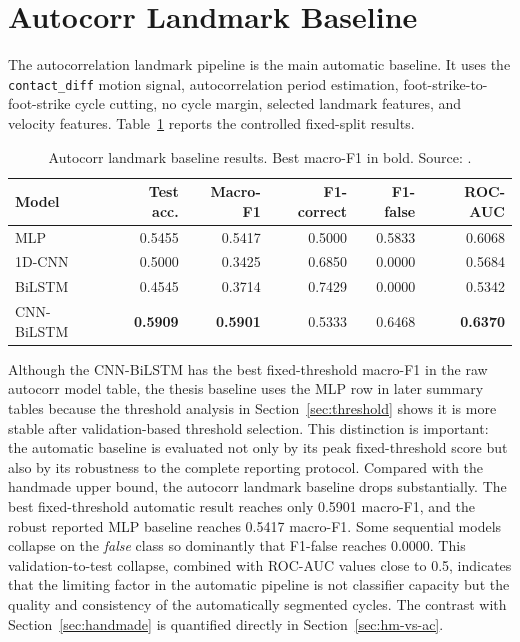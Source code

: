 \section{Autocorr Landmark Baseline}
\label{sec:autocorr-baseline}

The autocorrelation landmark pipeline is the main automatic baseline. It uses
the \texttt{contact\_diff} motion signal, autocorrelation period estimation,
foot-strike-to-foot-strike cycle cutting, no cycle margin, selected landmark
features, and velocity features. Table~\ref{tab:autocorr} reports the
controlled fixed-split results.

\begin{table}[htbp]
\centering
\caption[Autocorr landmark baseline results. Best macro-F1 in bold. Source: \protect{}.]{Autocorr landmark baseline results. Best macro-F1 in bold. Source: .}
\label{tab:autocorr}
\small
\begin{tabular}{lrrrrr}
\toprule
Model & Test acc. & Macro-F1 & F1-correct & F1-false & ROC-AUC \\
\midrule
MLP & 0.5455 & 0.5417 & 0.5000 & 0.5833 & 0.6068 \\
1D-CNN & 0.5000 & 0.3425 & 0.6850 & 0.0000 & 0.5684 \\
BiLSTM & 0.4545 & 0.3714 & 0.7429 & 0.0000 & 0.5342 \\
CNN-BiLSTM & \textbf{0.5909} & \textbf{0.5901} & 0.5333 & 0.6468 & \textbf{0.6370} \\
\bottomrule
\end{tabular}
\end{table}

Although the CNN-BiLSTM has the best fixed-threshold macro-F1 in the raw
autocorr model table, the thesis baseline uses the MLP row in later summary
tables because the threshold analysis in Section~\ref{sec:threshold} shows it
is more stable after validation-based threshold selection. This distinction is
important: the automatic baseline is evaluated not only by its peak
fixed-threshold score but also by its robustness to the complete reporting
protocol. Compared with the handmade upper bound, the autocorr landmark baseline drops
substantially. The best fixed-threshold automatic result reaches only 0.5901
macro-F1, and the robust reported MLP baseline reaches 0.5417 macro-F1. Some
sequential models collapse on the \emph{false} class so dominantly that F1-false reaches 0.0000.
This validation-to-test collapse, combined with ROC-AUC values close to 0.5,
indicates that the limiting factor in the automatic pipeline is not classifier
capacity but the quality and consistency of the automatically segmented
cycles. The contrast with Section~\ref{sec:handmade} is quantified directly in Section~\ref{sec:hm-vs-ac}.

